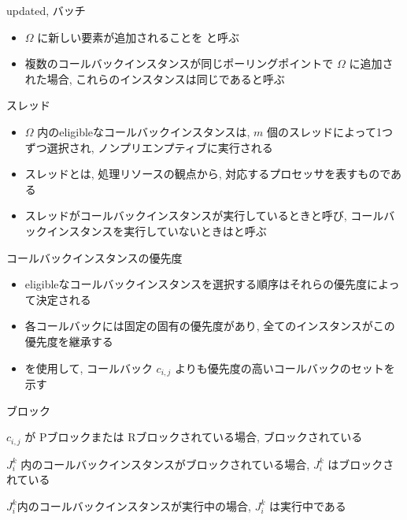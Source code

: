 \begin{frame}{updated, バッチ}
    \begin{itemize}
        \item $\Omega$ に新しい要素が追加されることを  と呼ぶ
        \item 複数のコールバックインスタンスが同じポーリングポイントで $\Omega$ に追加された場合, これらのインスタンスは同じであると呼ぶ
    \end{itemize}
\end{frame}

\begin{frame}{スレッド}
    \begin{itemize}
        \item $\Omega$ 内のeligibleなコールバックインスタンスは, $m$ 個のスレッドによって1つずつ選択され, ノンプリエンプティブに実行される
        \item スレッドとは, 処理リソースの観点から, 対応するプロセッサを表すものである
        \item スレッドがコールバックインスタンスが実行しているときと呼び, コールバックインスタンスを実行していないときはと呼ぶ
    \end{itemize}
\end{frame}

\begin{frame}{コールバックインスタンスの優先度}
    \begin{itemize}
        \item eligibleなコールバックインスタンスを選択する順序はそれらの優先度によって決定される
        \item 各コールバックには固定の固有の優先度があり, 全てのインスタンスがこの優先度を継承する
        \item {} を使用して, コールバック $c_{i, j}$ よりも優先度の高いコールバックのセットを示す
    \end{itemize}
\end{frame}

\begin{frame}{ブロック}
    \begin{definition}
        $c_{i, j}$ が Pブロックまたは Rブロックされている場合, ブロックされている
    \end{definition}
    \begin{definition}
        $J_{i}^{k}$ 内のコールバックインスタンスがブロックされている場合, $J_{i}^{k}$ はブロックされている
    \end{definition}
    \begin{definition}
        $J_{i}^{k}$内のコールバックインスタンスが実行中の場合, $J_{i}^{k}$ は実行中である
    \end{definition}
\end{frame}

